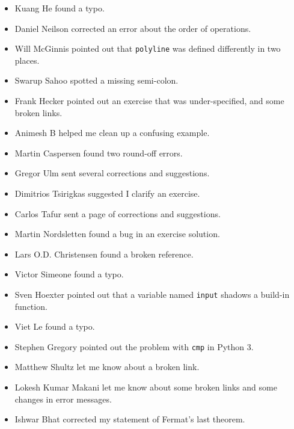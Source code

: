 \begin{itemize}
\item Kuang He found a typo.

\item Daniel Neilson corrected an error about the order of operations.

\item Will McGinnis pointed out that {\tt polyline} was defined
differently in two places.

\item Swarup Sahoo spotted a missing semi-colon.

\item Frank Hecker pointed out an exercise that was under-specified, and
some broken links.

\item Animesh B helped me clean up a confusing example.

\item Martin Caspersen found two round-off errors.

\item Gregor Ulm sent several corrections and suggestions.

\item Dimitrios Tsirigkas suggested I clarify an exercise.

\item Carlos Tafur sent a page of corrections and suggestions.

\item Martin Nordsletten found a bug in an exercise solution.

\item Lars O.D. Christensen found a broken reference.

\item Victor Simeone found a typo.

\item Sven Hoexter pointed out that a variable named {\tt input}
shadows a build-in function.

\item Viet Le found a typo.

\item Stephen Gregory pointed out the problem with {\tt cmp}
in Python 3.

\item Matthew Shultz let me know about a broken link.

\item Lokesh Kumar Makani let me know about some broken links and some
changes in error messages.

\item Ishwar Bhat corrected my statement of Fermat's last theorem.


\end{itemize}
